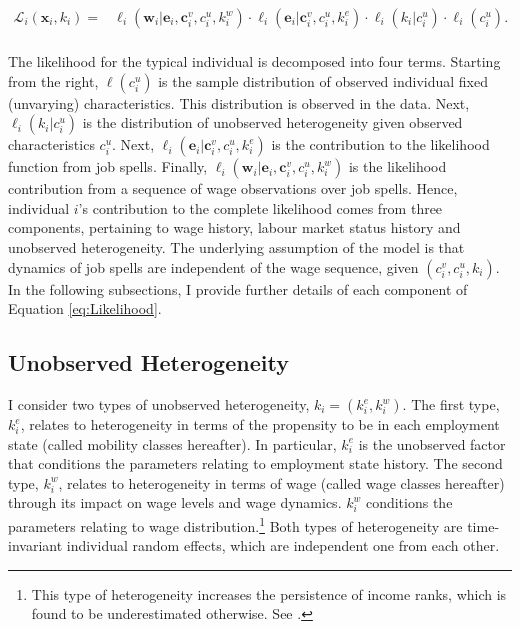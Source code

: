 \documentclass[12pt, a4paper]{article}
\let\Oldsubsection\subsection
\renewcommand{\subsection}{\FloatBarrier\Oldsubsection}
\begin{document}

\begin{align}\label{eq:Likelihood}
\mathcal{L}_{i}(\textbf{x}_i,k_i)= & \ell_{i}(\textbf{w}_i|\textbf{e}_i,\textbf{c}_i^v,c_i^u,k^w_i) \cdot \ell_{i}(\textbf{e}_i|\textbf{c}_i^v,c_i^u,k^e_i)\cdot \ell_{i}(k_i|c_i^u)\cdot \ell_{i}(c_i^u).\\ \nonumber
\end{align}



The likelihood for the typical individual is decomposed into four terms. Starting from the right, $\ell (c_i^u)$ is the sample distribution of observed individual fixed (unvarying) characteristics. This distribution is observed in the data. Next, $\ell_{i}(k_i|c_i^u)$ is the distribution of unobserved heterogeneity given observed characteristics $c_i^u$. Next, $\ell_{i}(\textbf{e}_i|\textbf{c}_{i}^{v},c_{i}^{u},k^e_{i})$ is the contribution to the likelihood function from job spells. Finally, $\ell_{i}(\textbf{w}_i|\textbf{e}_i,\textbf{c}_i^v,c_i^u,k^w_i)$ is the likelihood contribution from a sequence of wage observations over job spells. Hence, individual $i$'s contribution to the complete likelihood comes from three components, pertaining to wage history, labour market status history and unobserved heterogeneity. The underlying assumption of the model is that dynamics of job spells are independent of the wage sequence, given $({c}_i^v,c_i^u,k_i)$. In the following subsections, I provide further details of each component of Equation \eqref{eq:Likelihood}.

\subsection{Unobserved Heterogeneity}\label{Sec:unobs_het}

I consider two types of unobserved heterogeneity, $k_i=(k_i^{e},k_i^w)$. The first type, $k_i^{e}$, relates to heterogeneity in terms of the propensity to be in each employment state (called mobility classes hereafter). In particular, $k_i^{e}$ is the unobserved factor that conditions the parameters relating to employment state history. The second type, $k_i^w$, relates to heterogeneity in terms of wage (called wage classes hereafter) through its impact on wage levels and wage dynamics. $k_i^w$ conditions the parameters relating to wage distribution.\footnote{This type of heterogeneity increases the persistence of income ranks, which is found to be underestimated otherwise. See \cite{Sh76}.} Both types of heterogeneity are time-invariant individual random effects, which are independent one from each other.
\end{document}
